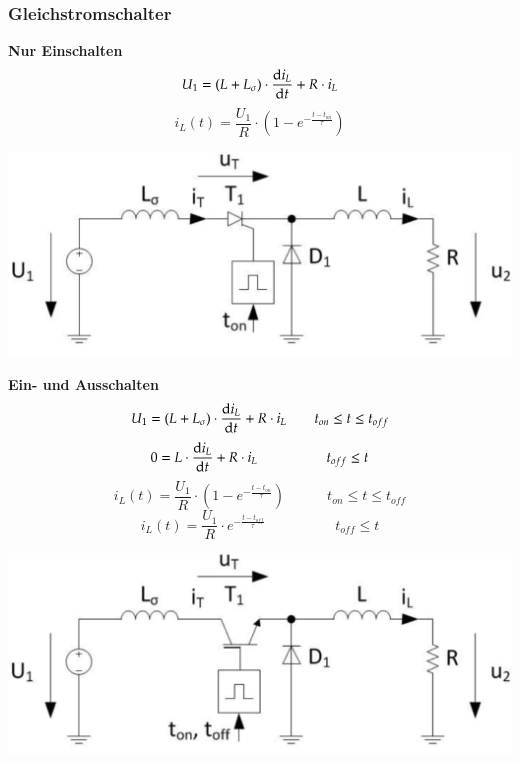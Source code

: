 \subsubsection{Gleichstromschalter}
\begin{minipage}{0.5\linewidth}
    \textbf{Nur Einschalten}\newline
    \[ U_1=(L + L_{\sigma})\cdot \frac{\mathop{}\!\mathrm{d} i_L}{\mathop{}\!\mathrm{d} t}+R\cdot i_L \]
    \[ i_L(t)=\frac{U_1}{R}\cdot(1-e^{-\frac{t-t_{on}}{\tau}})\]
\end{minipage}
\begin{minipage}{0.4\linewidth}
    \includegraphics[width=1.2\linewidth]{images/GsSchalterOn}
\end{minipage}

\begin{minipage}{0.5\linewidth}
\textbf{Ein- und Ausschalten}\newline
\[ U_1=(L + L_{\sigma})\cdot \frac{\mathop{}\!\mathrm{d} i_L}{\mathop{}\!\mathrm{d} t}+R\cdot i_L \qquad t_{on} \leq t \leq t_{off}\]
\[ 0=L\cdot \frac{\mathop{}\!\mathrm{d} i_L}{\mathop{}\!\mathrm{d} t}+ R\cdot i_L \qquad \qquad \quad t_{off}\leq t \]
\[ i_L(t)=\frac{U_1}{R}\cdot(1-e^{-\frac{t-t_{on}}{\tau}}) \qquad \quad t_{on} \leq t \leq t_{off}\]
\[ i_L(t)=\frac{U_1}{R}\cdot e^{-\frac{t-t_{off}}{\tau}} \qquad \quad \qquad t_{off}\leq t \]
\end{minipage}
\begin{minipage}{0.4\linewidth}
    \includegraphics[width=1.2\linewidth]{images/GsSchalterOnOff}
\end{minipage}


